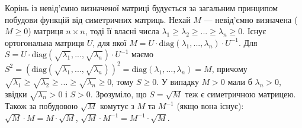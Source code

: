 \begin{remark}
    Корінь із невід'ємно визначеної матриці будується за загальним принципом побудови функцій від симетричних матриць.
    Нехай $M$ --- невід'ємно визначена ($M \geq 0$) матриця $n \times n$, тоді її власні числа $\lambda_1 \geq \lambda_2 \geq ... \geq \lambda_n \geq 0$.
    Існує ортогональна матриця $U$, для якої $M = U \cdot \mathrm{diag}(\lambda_1, ..., \lambda_n) \cdot U^{-1}$.
    Для $S = U \cdot \mathrm{diag}(\sqrt{\lambda_1}, ..., \sqrt{\lambda_n}) \cdot U^{-1}$ маємо
    $S^2 = \left(\mathrm{diag}(\sqrt{\lambda_1}, ..., \sqrt{\lambda_n})\right)^2 = \mathrm{diag}(\lambda_1, ..., \lambda_n) = M$,
    причому $\sqrt{\lambda_1} \geq \sqrt{\lambda_2} \geq ... \geq \sqrt{\lambda_n} \geq 0$, тому $S \geq 0$. У випадку $M>0$
    мали б $\lambda_n > 0$, звідки $\sqrt{\lambda_n} > 0$ і $S > 0$. Зрозуміло, що $S = \sqrt{M}$ теж є симетричною матрицею. Також за побудовою
    $\sqrt{M}$ комутує з $M$ та $M^{-1}$ (якщо вона існує): $\sqrt{M} \cdot M = M \cdot \sqrt{M}$, $\sqrt{M} \cdot M^{-1} = M^{-1} \cdot \sqrt{M}$. 
\end{remark}
